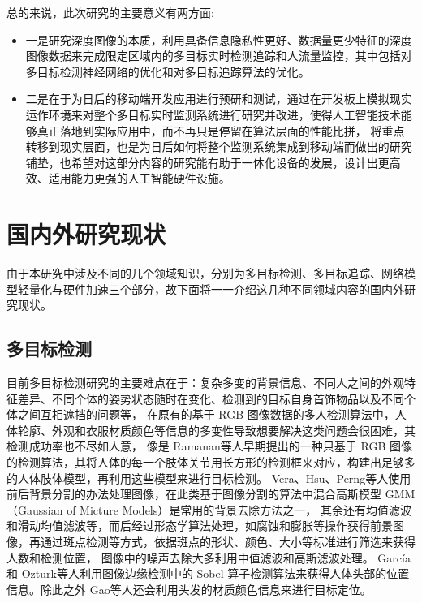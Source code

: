 总的来说，此次研究的主要意义有两方面:
\begin{itemize}
	\item 一是研究深度图像的本质，利用具备信息隐私性更好、数据量更少特征的深度图像数据来完成限定区域内的多目标实时检测追踪和人流量监控，其中包括对多目标检测神经网络的优化和对多目标追踪算法的优化。

	\item 二是在于为日后的移动端开发应用进行预研和测试，通过在开发板上模拟现实运作环境来对整个多目标实时监测系统进行研究并改进，使得人工智能技术能够真正落地到实际应用中，而不再只是停留在算法层面的性能比拼，
	将重点转移到现实层面，也是为日后如何将整个监测系统集成到移动端而做出的研究铺垫，也希望对这部分内容的研究能有助于一体化设备的发展，设计出更高效、适用能力更强的人工智能硬件设施。
\end{itemize}

\section{国内外研究现状}

由于本研究中涉及不同的几个领域知识，分别为多目标检测、多目标追踪、网络模型轻量化与硬件加速三个部分，故下面将一一介绍这几种不同领域内容的国内外研究现状。

\subsection{多目标检测}
目前多目标检测研究的主要难点在于：复杂多变的背景信息、不同人之间的外观特征差异、不同个体的姿势状态随时在变化、检测到的目标自身首饰物品以及不同个体之间互相遮挡的问题等\cite{2}，
在原有的基于 RGB 图像数据的多人检测算法中，人体轮廓、外观和衣服材质颜色等信息的多变性导致想要解决这类问题会很困难，其检测成功率也不尽如人意，
像是 Ramanan\cite{3}等人早期提出的一种只基于 RGB 图像的检测算法，其将人体的每一个肢体关节用长方形的检测框来对应，构建出足够多的人体肢体模型，再利用这些模型来进行目标检测。
Vera\cite{4}、Hsu\cite{5}、Perng\cite{6}等人使用前后背景分割的办法处理图像，在此类基于图像分割的算法中混合高斯模型 GMM（Gaussian of Micture Models）是常用的背景去除方法之一，
其余还有均值滤波和滑动均值滤波等，而后经过形态学算法处理，如腐蚀和膨胀等操作获得前景图像，再通过斑点检测等方式，依据斑点的形状、颜色、大小等标准进行筛选来获得人数和检测位置，
图像中的噪声去除大多利用中值滤波和高斯滤波处理。
García\cite{7}和 Ozturk\cite{8}等人利用图像边缘检测中的 Sobel 算子检测算法来获得人体头部的位置信息。除此之外 Gao\cite{9}等人还会利用头发的材质颜色信息来进行目标定位。

